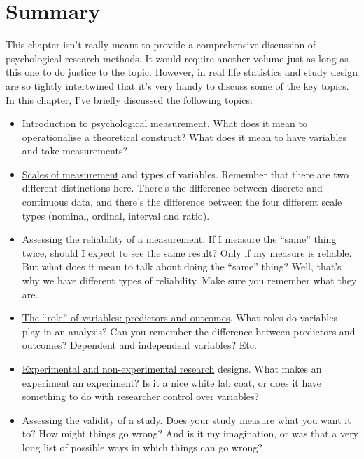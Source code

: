 \documentclass[
  a4paper,
]{book}
\providecommand{\tightlist}{%
  \setlength{\itemsep}{0pt}\setlength{\parskip}{0pt}}\usepackage{longtable,booktabs,array}
\begin{document}
\hypertarget{summary}{%
\section{Summary}\label{summary}}

This chapter isn't really meant to provide a comprehensive discussion of
psychological research methods. It would require another volume just as
long as this one to do justice to the topic. However, in real life
statistics and study design are so tightly intertwined that it's very
handy to discuss some of the key topics. In this chapter, I've briefly
discussed the following topics:

\begin{itemize}
\tightlist
\item
  \protect\hyperlink{sec-Introduction-to-psychological-measurement}{Introduction
  to psychological measurement}. What does it mean to operationalise a
  theoretical construct? What does it mean to have variables and take
  measurements?
\item
  \protect\hyperlink{sec-Scales-of-measurement}{Scales of measurement}
  and types of variables. Remember that there are two different
  distinctions here. There's the difference between discrete and
  continuous data, and there's the difference between the four different
  scale types (nominal, ordinal, interval and ratio).
\item
  \protect\hyperlink{sec-Assessing-the-reliability-of-a-measurement}{Assessing
  the reliability of a measurement}. If I measure the ``same'' thing
  twice, should I expect to see the same result? Only if my measure is
  reliable. But what does it mean to talk about doing the ``same''
  thing? Well, that's why we have different types of reliability. Make
  sure you remember what they are.
\item
  \protect\hyperlink{the-role-of-variables-predictors-and-outcomes}{The
  ``role'' of variables: predictors and outcomes}. What roles do
  variables play in an analysis? Can you remember the difference between
  predictors and outcomes? Dependent and independent variables? Etc.
\item
  \protect\hyperlink{experimental-and-non-experimental-research}{Experimental
  and non-experimental research} designs. What makes an experiment an
  experiment? Is it a nice white lab coat, or does it have something to
  do with researcher control over variables?
\item
  \protect\hyperlink{assessing-the-validity-of-a-study}{Assessing the
  validity of a study}. Does your study measure what you want it to? How
  might things go wrong? And is it my imagination, or was that a very
  long list of possible ways in which things can go wrong?
\end{itemize}
\end{document}
